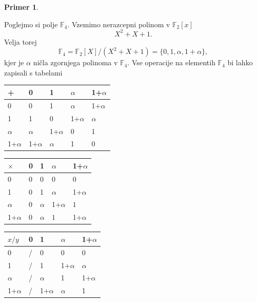 \documentclass[12pt,a4paper,twoside]{article}
\theoremstyle{definition} %
\newtheorem{primer}[definicija]{Primer}
\theoremstyle{plain} %
\numberwithin{equation}{section}  %
\newcommand{\F}{\mathbb F}
\newcommand{\Fq}[1]{{\mathbb{F}_{#1}}}
\begin{document}
\begin{primer}~

Poglejmo si polje $\F_4$. Vzemimo nerazcepni polinom v $\Fq{2}[x]$
$$X^2+X+1.$$
Velja torej
$$\F_4 = \F_2[X]/(X^2+X+1) = \{ 0,1,\alpha,1 +\alpha \},$$
kjer je $\alpha$ ničla zgornjega polinoma v $\F_4$.
Vse operacije na elementih $\F_4$ bi lahko zapisali s tabelami


\begin{table}[H]
  \centering
\begin{minipage}{.5\textwidth}
 \begin{tabular}{l|llll}
+          & 0          & 1          & $\alpha$   & 1+$\alpha$ \\ \hline
0          & 0          & 1          & $\alpha$   & 1+$\alpha$ \\
1          & 1          & 0          & 1+$\alpha$ & $\alpha$   \\
$\alpha$   & $\alpha$   & 1+$\alpha$ & 0          & 1          \\
1+$\alpha$ & 1+$\alpha$ & $\alpha$   & 1          & 0         
\end{tabular}
  \label{table:ses}
\end{minipage}%
\begin{minipage}{.5\textwidth}
\centering
\begin{tabular}{l|llll}
$\times$   & 0 & 1        & $\alpha$   & 1+$\alpha$ \\ \hline
0          & 0 & 0        & 0          & 0          \\
1          & 0 & 1        & $\alpha$   & 1+$\alpha$ \\
$\alpha$   & 0 & $\alpha$ & 1+$\alpha$ & $1$   \\
1+$\alpha$ & 0 & $\alpha$ & $1$   & 1+$\alpha$
\end{tabular}
\label{table:mno}
\end{minipage}
\end{table}


\begin{table}[H]
\begin{tabular}{l|llll}
$x/y$      & 0 & 1          & $\alpha$   & 1+$\alpha$ \\ \hline
0          & / & 0          & 0          & 0          \\
1          & / & 1          & 1+$\alpha$ & $\alpha$   \\
$\alpha$   & / & $\alpha$   & 1          & 1+$\alpha$ \\
1+$\alpha$ & / & 1+$\alpha$ & $\alpha$   & 1         
\end{tabular}
\label{table:delj}
\end{table}
\end{primer}
\end{document}
